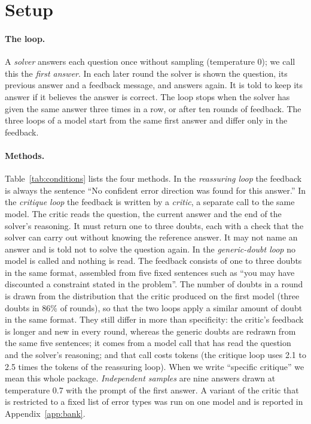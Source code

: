 \documentclass[11pt]{article}
\begin{document}
\section{Setup}
\label{sec:setup}

\paragraph{The loop.}
A \emph{solver} answers each question once without sampling (temperature 0); we call this the \emph{first answer}.
In each later round the solver is shown the question, its previous answer and a feedback message, and answers again.
It is told to keep its answer if it believes the answer is correct.
The loop stops when the solver has given the same answer three times in a row, or after ten rounds of feedback.
The three loops of a model start from the same first answer and differ only in the feedback.

\paragraph{Methods.}
Table~\ref{tab:conditions} lists the four methods.
In the \emph{reassuring loop} the feedback is always the sentence ``No confident error direction was found for this answer.''
In the \emph{critique loop} the feedback is written by a \emph{critic}, a separate call to the same model.
The critic reads the question, the current answer and the end of the solver's reasoning.
It must return one to three doubts, each with a check that the solver can carry out without knowing the reference answer.
It may not name an answer and is told not to solve the question again.
In the \emph{generic-doubt loop} no model is called and nothing is read.
The feedback consists of one to three doubts in the same format, assembled from five fixed sentences such as ``you may have discounted a constraint stated in the problem''.
The number of doubts in a round is drawn from the distribution that the critic produced on the first model (three doubts in 86\% of rounds), so that the two loops apply a similar amount of doubt in the same format.
They still differ in more than specificity: the critic's feedback is longer and new in every round, whereas the generic doubts are redrawn from the same five sentences; it comes from a model call that has read the question and the solver's reasoning; and that call costs tokens (the critique loop uses 2.1 to 2.5 times the tokens of the reassuring loop).
When we write ``specific critique'' we mean this whole package.
\emph{Independent samples} are nine answers drawn at temperature 0.7 with the prompt of the first answer.
A variant of the critic that is restricted to a fixed list of error types was run on one model and is reported in Appendix~\ref{app:bank}.
\end{document}
